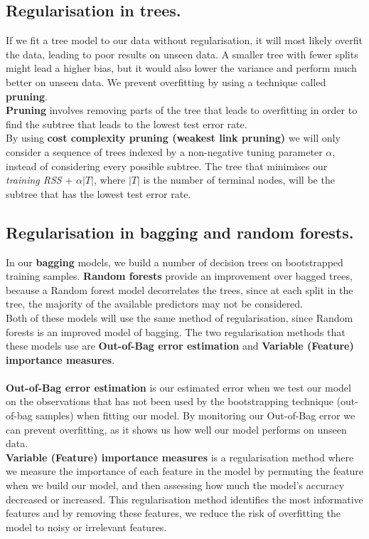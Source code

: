 \documentclass[12pt]{article}
\begin{document}
\subsection*{Regularisation in trees.}
If we fit a tree model to our data without regularisation, it will most likely overfit the data, leading to poor results on unseen data. 
A smaller tree with fewer splits might lead a higher bias, but it would also lower the variance and perform much better on unseen data.
We prevent overfitting by using a technique called \textbf{pruning}.\\
\textbf{Pruning} involves removing parts of the tree that leads to overfitting in order to find the subtree that leads to the lowest test error rate.
\\ By using \textbf{cost complexity pruning (weakest link pruning)} we will only consider a sequence of trees indexed by a non-negative tuning parameter $\alpha$,
instead of considering every possible subtree. The tree that minimises our \textit{training RSS} + $\alpha|T|$, where $|T|$ is the number of terminal nodes,
will be the subtree that has the lowest test error rate.

\subsection*{Regularisation in bagging and random forests.}
In our \textbf{bagging} models, we build a number of decision trees on bootstrapped training samples. \textbf{Random forests}
provide an improvement over bagged trees, because a Random forest model decorrelates the trees, since at each split in the tree,
the majority of the available predictors may not be considered. \\
Both of these models will use the same method of regularisation, since Random forests is an improved model of bagging.
The two regularisation methods that these models use are \textbf{Out-of-Bag error estimation} and \textbf{Variable (Feature) importance measures}.
\\ \\
\textbf{Out-of-Bag error estimation} is our estimated error when we test our model on the observations that has not been used by the bootstrapping technique (out-of-bag samples) when fitting our model.
By monitoring our Out-of-Bag error we can prevent overfitting, as it shows us how well our model performs on unseen data.\\
\textbf{Variable (Feature) importance measures} is a regularisation method where we measure the importance of each feature in the model by permuting the feature when we build our model,
and then assessing how much the model's accuracy decreased or increased. This regularisation method identifies the most informative features and by removing these features,
we reduce the risk of overfitting the model to noisy or irrelevant features.
\end{document}
